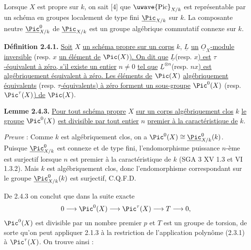 


Lorsque \(X\) est propre sur \(k\), on sait [4] que \(\text{\uwave{Pic}}_{X/k}\) est représentable par un schéma en groupes localement de type fini \(\underline{\Pic}_{X/k}\) sur \(k\). La composante neutre \(\underline{\Pic}^0_{X/k}\) de \(\underline{\Pic}_{X/k}\) est un groupe algébrique commutatif connexe sur \(k\).

\textbf{Définition 2.4.1.} \uline{Soit} \(X\) \uline{un schéma propre sur un corps} \(k\), \(\underline{L}\) \uline{un} \(\underline{O}_X\)\uline{-module inversible} (resp. \(x\) \uline{un élément de} \(\Pic(X)\)\uline{). On dit que} \(\underline{L}\)(resp. \(x\)\uline{) est} \(\tau\)\uline{-équivalent à zéro, s'il existe un entier} \(n\ne0\) \uline{tel que} \(\underline{L}^{\otimes n}\)(resp. \(nx\)\uline{) est algébriquement équivalent à zéro. Les éléments de} \(\Pic(X)\) \uline{algébriquement équivalents} (resp. \(\tau\)\uline{-équivalents) à zéro forment un sous-groupe} \(\Pic^0(X)\) (resp. \(\Pic^\tau(X)\)\uline{) de} \(\Pic(X)\).

\textbf{Lemme 2.4.3.} \uline{Pour tout schéma propre} \(X\) \uline{sur un corps algébriquement clos} \(k\) \uline{le groupe} \(\Pic^0(X)\) \uline{est divisible par tout entier} \(n\) \uline{premier à la caractéristique de} \(k\).

\emph{Preuve} : Comme \(k\) est algébriquement clos, on a \(\Pic^0(X)\cong \underline{\Pic}^0_{X/k}(k)\). Puisque \(\underline{\Pic}^0_{X/k}\) est connexe et de type fini, l'endomorphisme puissance \(n\)-ème est surjectif lorsque \(n\) est premier à la caractéristique de \(k\) (SGA 3 XV 1.3 et VI 1.3.2). Mais \(k\) est algébriquement clos, donc l'endomorphisme correspondant sur le groupe \(\underline{\Pic}^0_{X/k}(k)\) est surjectif, C.Q.F.D.

De 2.4.3 on conclut que dans la suite exacte
\[
0\longrightarrow\Pic^0(X)\longrightarrow\Pic^\tau(X)\longrightarrow T\longrightarrow0,
\]
\(\Pic^0(X)\) est divisible par un nombre premier \(p\) et \(T\) est un groupe de torsion, de sorte qu'on peut appliquer 2.1.3 à la restriction de l'application polynôme (2.3.1) à \(\Pic^\tau(X)\). On trouve ainsi :

